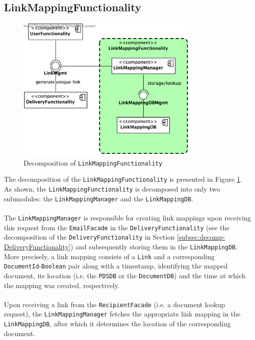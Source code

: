 \documentclass[a4paper,10pt]{article}
\begin{document}
\subsection{LinkMappingFunctionality}\label{subsec:decomp-LinkMappingFunctionality}
\begin{figure}[!htp]
	\centering
	\includegraphics[width=0.8\textwidth]{LinkMappingFunctionality.png}
	\caption{Decomposition of \texttt{LinkMappingFunctionality}}
	\label{fig:decomp-LinkMappingFunctionality}
\end{figure}
\FloatBarrier
\noindent
The decomposition of the \texttt{LinkMappingFunctionality} is presented in Figure \ref{fig:decomp-LinkMappingFunctionality}. As shown, the \texttt{LinkMappingFunctionality} is decomposed into only two submodules: the \texttt{LinkMappingManager} and the \texttt{LinkMappingDB}.\\\\
The \texttt{LinkMappingManager} is responsible for creating link mappings upon receiving this request from the \texttt{EmailFacade} in the \texttt{DeliveryFunctionality} (see the decomposition of the \texttt{DeliveryFunctionality} in Section \ref{subsec:decomp-DeliveryFunctionality}) and subsequently storing them in the \texttt{LinkMappingDB}. More precisely, a link mapping consists of a \texttt{Link} and a corresponding \texttt{DocumentId}-\texttt{Boolean} pair along with a timestamp, identifying the mapped document, its location (i.e. the \texttt{PDSDB} or the \texttt{DocumentDB}) and the time at which the mapping was created, respectively.\\\\
Upon receiving a link from the \texttt{RecipientFacade} (i.e. a document lookup request), the \texttt{LinkMappingManager} fetches the appropriate link mapping in the \texttt{LinkMappingDB}, after which it determines the location of the corresponding document.
\end{document}
